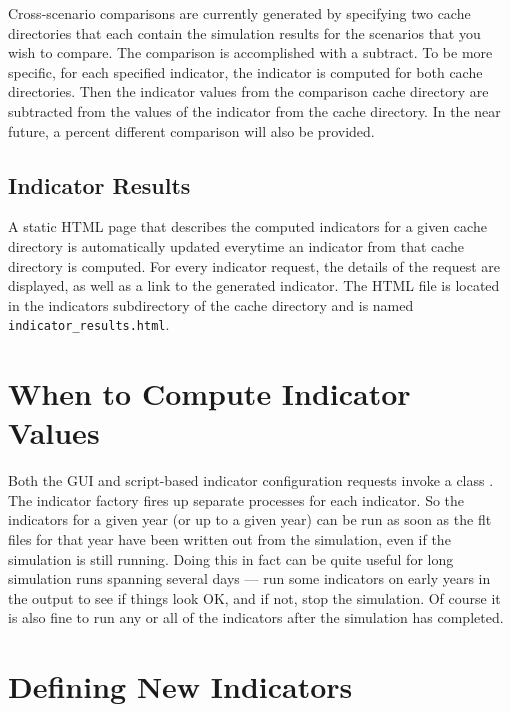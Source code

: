 Cross-scenario comparisons are currently generated by specifying two 
cache directories that each contain the simulation results for the 
scenarios that you wish to compare. The comparison is 
accomplished with a subtract. To be more specific, for each specified 
indicator, the indicator is computed for both cache directories. Then
the indicator values from the comparison cache directory are subtracted
from the values of the indicator from the cache directory. 
In the near future, a percent different comparison will also be provided.

\subsection{Indicator Results}
\label{sec:indicator-results}

A static HTML page that describes the computed indicators for a given
cache directory is automatically updated everytime an indicator from 
that cache directory is computed. For every indicator request, the 
details of the request are displayed, as well as a link to the generated 
indicator. The HTML file is located in the indicators subdirectory of the 
cache directory and is named \verb|indicator_results.html|.

\section{When to Compute Indicator Values}
\indicatorsindex\attributesindex

Both the GUI and script-based indicator configuration requests invoke a
class .  The indicator factory fires up separate
processes for each indicator.  So the indicators \indicatorsindex for a
given year (or up to a given year) can be run as soon as the flt files for
that year have been written out from the simulation, even if the simulation
is still running.  Doing this in fact can be quite useful for long
simulation runs spanning several days --- run some indicators
\indicatorsindex on early years in the output to see if things look OK, and
if not, stop the simulation.  Of course it is also fine to run any or all
of the indicators \indicatorsindex after the simulation has completed.

\section{Defining New Indicators}
\indicatorsindex\attributesindex

